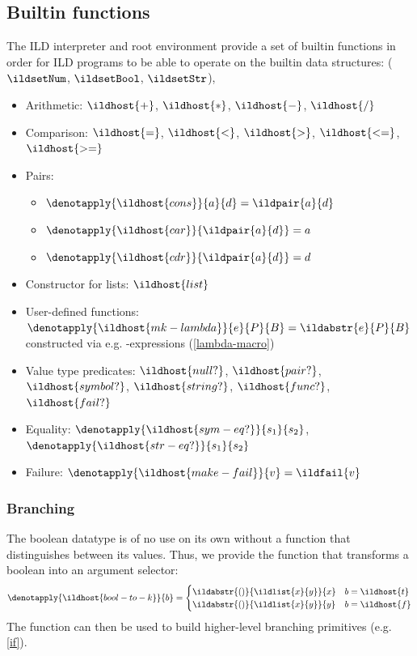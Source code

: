 \subsection{Builtin functions}
\label{builtin-funcs}
The ILD interpreter and root environment provide a set of builtin functions
in order for ILD programs to be able to operate on the builtin data structures:
(\(\ildsetNum\), \(\ildsetBool\), \(\ildsetStr\)),
\begin{itemize}
  \item Arithmetic: \(\ildhost{+}\), \(\ildhost{*}\), \(\ildhost{-}\), \(\ildhost{/}\)
  \item Comparison: \(\ildhost{=}\), \(\ildhost{<}\),
    \(\ildhost{>}\), \(\ildhost{<=}\), \(\ildhost{>=}\)
  \item Pairs:
    \begin{itemize}
      \item \(\denotapply{\ildhost{cons}}{a}{d} = \ildpair{a}{d}\)
      \item \(\denotapply{\ildhost{car}}{\ildpair{a}{d}} = a\)
      \item \(\denotapply{\ildhost{cdr}}{\ildpair{a}{d}} = d\)
    \end{itemize}
  \item Constructor for lists: \(\ildhost{list}\)
  \item User-defined functions: \(\denotapply{\ildhost{mk-lambda}}{e}{P}{B} = \ildabstr{e}{P}{B}\) \\
  constructed via e.g. -expressions (\cref{lambda-macro})
  \item Value type predicates: \(\ildhost{null?}\), \(\ildhost{pair?}\),
    \(\ildhost{symbol?}\), \(\ildhost{string?}\), \(\ildhost{func?}\),
    \(\ildhost{fail?}\)
  \item Equality: \(\denotapply{\ildhost{sym-eq?}}{s_1}{s_2}\), \(\denotapply{\ildhost{str-eq?}}{s_1}{s_2}\)
  \item Failure: \(\denotapply{\ildhost{make-fail}}{v} = \ildfail{v}\)
\end{itemize}
\subsubsection{Branching}\label{branching}
The boolean datatype is of no use on its own without a function that
distinguishes between its values. Thus, we provide
the  function that transforms a boolean into
an argument selector:
\begin{equation}
  \denotapply{\ildhost{bool-to-k}}{b} =
      \begin{cases}
        \ildabstr{()}{\ildlist{x}{y}}{x} & b = \ildhost{t} \\
        \ildabstr{()}{\ildlist{x}{y}}{y} & b = \ildhost{f} \\
      \end{cases}
\end{equation}
The 
function can then be used to build higher-level branching primitives
(e.g. \cref{if}).
